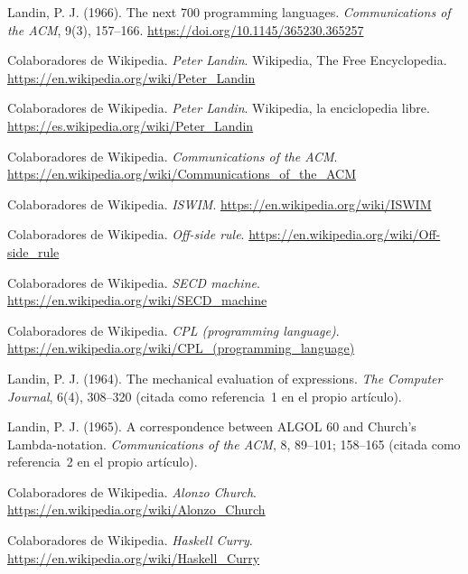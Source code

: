 \documentclass[11pt,twoside,openany]{report}
\begin{document}

\begin{enumerate}[label={[\arabic*]}, ref={\arabic*}, leftmargin=2.2em, itemsep=0pt, topsep=0pt, parsep=0pt]
  \footnotesize\sloppy
  \item\label{ref:landin66} Landin, P. J. (1966). The next 700 programming languages. \emph{Communications of the ACM}, 9(3), 157--166. \url{https://doi.org/10.1145/365230.365257}
  \item\label{ref:wikien} Colaboradores de Wikipedia. \emph{Peter Landin}. Wikipedia, The Free Encyclopedia. \url{https://en.wikipedia.org/wiki/Peter_Landin}
  \item\label{ref:wikies} Colaboradores de Wikipedia. \emph{Peter Landin}. Wikipedia, la enciclopedia libre. \url{https://es.wikipedia.org/wiki/Peter_Landin}
  \item\label{ref:cacm} Colaboradores de Wikipedia. \emph{Communications of the ACM}. \url{https://en.wikipedia.org/wiki/Communications_of_the_ACM}
  \item\label{ref:iswim} Colaboradores de Wikipedia. \emph{ISWIM}. \url{https://en.wikipedia.org/wiki/ISWIM}
  \item\label{ref:offside} Colaboradores de Wikipedia. \emph{Off-side rule}. \url{https://en.wikipedia.org/wiki/Off-side_rule}
  \item\label{ref:secd} Colaboradores de Wikipedia. \emph{SECD machine}. \url{https://en.wikipedia.org/wiki/SECD_machine}
  \item\label{ref:cpl} Colaboradores de Wikipedia. \emph{CPL (programming language)}. \url{https://en.wikipedia.org/wiki/CPL_(programming_language)}
  \item\label{ref:secd1964} Landin, P. J. (1964). The mechanical evaluation of expressions. \emph{The Computer Journal}, 6(4), 308--320 (citada como referencia~1 en el propio artículo).
  \item\label{ref:algol1965} Landin, P. J. (1965). A correspondence between ALGOL 60 and Church's Lambda-notation. \emph{Communications of the ACM}, 8, 89--101; 158--165 (citada como referencia~2 en el propio artículo).
  \item\label{ref:church} Colaboradores de Wikipedia. \emph{Alonzo Church}. \url{https://en.wikipedia.org/wiki/Alonzo_Church}
  \item\label{ref:curry} Colaboradores de Wikipedia. \emph{Haskell Curry}. \url{https://en.wikipedia.org/wiki/Haskell_Curry}

\end{enumerate}
\end{document}
